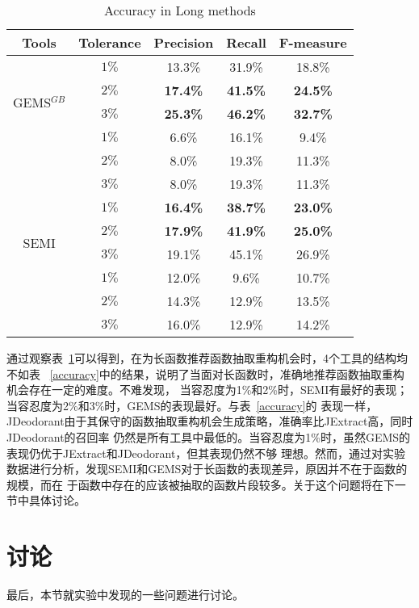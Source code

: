 \begin{table}[!t]
  \scriptsize
  \renewcommand{\arraystretch}{1.3}
  \caption{Accuracy in Long methods}
  \label{long_methods}
  \centering
  \begin{tabular}{cc|ccc}
  \toprule
   Tools &Tolerance &Precision &Recall &F-measure\\ 
  \hline
  \multirow{4}{*}{GEMS$^{GB}$}&$1\%$ &13.3\% &31.9\% &18.8\% \\ 
  &$2\%$ &\bf{17.4\%} &\bf{41.5\%} &\bf{24.5\%} \\ 
  &$3\%$ &\bf{25.3\%} &\bf{46.2\%} &\bf{32.7\%} \\ 
  \hline
  \multirow{4}{*}{JExtract}&$1\%$ &6.6\% &16.1\% &9.4\% \\ 
  &$2\%$ &8.0\% &19.3\% &11.3\% \\ 
  &$3\%$ &8.0\% &19.3\% &11.3\% \\ 
  \hline
  \multirow{4}{*}{SEMI}&$1\%$ &\bf{16.4\%} &\bf{38.7\%} &\bf{23.0\%} \\ 
  &$2\%$ &\bf{17.9\%} &\bf{41.9\%} &\bf{25.0\%} \\ 
  &$3\%$ &19.1\% &45.1\% &26.9\% \\ 
  \hline
  \multirow{4}{*}{JDeodorant}&$1\%$ &12.0\% &9.6\% &10.7\% \\
  &$2\%$ &14.3\% &12.9\% &13.5\% \\ 
  &$3\%$ &16.0\% &12.9\% &14.2\% \\ 
  \bottomrule
  \end{tabular}
  \end{table}
  
通过观察表~\ref{long_methods}可以得到，在为长函数推荐函数抽取重构机会时，4个工具的结构均不如表
~\ref{accuracy}中的结果，说明了当面对长函数时，准确地推荐函数抽取重构机会存在一定的难度。不难发现，
当容忍度为1\%和2\%时，SEMI有最好的表现；当容忍度为2\%和3\%时，GEMS的表现最好。与表~\ref{accuracy}的
表现一样，JDeodorant由于其保守的函数抽取重构机会生成策略，准确率比JExtract高，同时JDeodorant的召回率
仍然是所有工具中最低的。当容忍度为1\%时，虽然GEMS的表现仍优于JExtract和JDeodorant，但其表现仍然不够
理想。然而，通过对实验数据进行分析，发现SEMI和GEMS对于长函数的表现差异，原因并不在于函数的规模，而在
于函数中存在的应该被抽取的函数片段较多。关于这个问题将在下一节中具体讨论。

\section{讨论}\label{discuss}
最后，本节就实验中发现的一些问题进行讨论。

